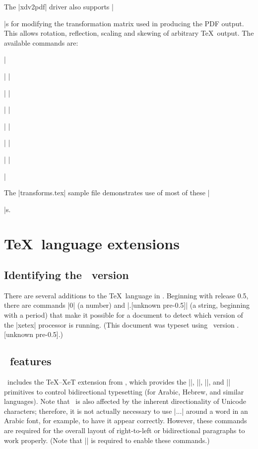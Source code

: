 The |xdv2pdf| driver also supports |\special|s for modifying the transformation matrix used in producing the PDF output. This allows rotation, reflection, scaling and skewing of arbitrary \TeX\ output. The available commands are:
{\obeylines \parskip0pt \parindent
	||
	||
	||
	||
	||
	||
	||\par}\noindent
The |transforms.tex| sample file demonstrates use of most of these |\special|s.

\section{\TeX\ language extensions}

\subsection[Identifying the XeTeX version]{Identifying the \XeTeX\ version}

\ifx\XeTeXversion\undefined {} \def\XeTeXrevision{.[unknown pre-0.5]} \fi

\the\XeTeXversion 

There are several additions to the \TeX\ language in \XeTeX. 
Beginning with release 0.5, there are commands |\XeTeXversion| (a number) and |\XeTeXrevision| (a string, beginning with a period) that make it possible for a document to detect which version of the |xetex| processor is running. (This document was typeset using \XeTeX\ version \number\XeTeXversion\XeTeXrevision.)

\subsection{\eTeX\ features}

\XeTeX\ includes the TeX--XeT extension from \eTeX, which provides the |\beginL|, |\endL|, |\beginR|, and |\endR| primitives to control bidirectional typesetting (for Arabic, Hebrew, and similar languages). Note that \XeTeX\ is also affected by the inherent directionality of Unicode characters; therefore, it is not actually necessary to use |\beginR...\endR| around a word in an Arabic font, for example, to have it appear correctly. However, these commands are required for the overall layout of right-to-left or bidirectional paragraphs to work properly. (Note that || is required to enable these commands.)


